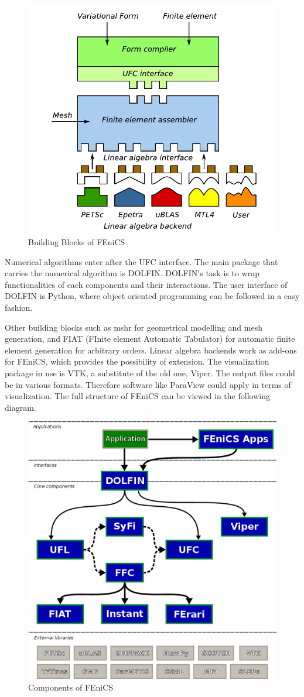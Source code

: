 \documentclass[10pt,a4paper]{scrreprt}
\begin{document}
\begin{figure}[h]
\center
\label{fig: fenics blocks}
\includegraphics[width=0.6\linewidth]{../pics/fenics_building_blocks.png}
\caption{Building Blocks of FEniCS \citep{wells2012automated}}
\end{figure} 

Numerical algorithms enter after the UFC interface. The main package that carries the numerical algorithm is DOLFIN. DOLFIN's task is to wrap functionalities of each components and their interactions. The user interface of DOLFIN is Python, where object oriented programming can be followed in a easy fashion.  

Other building blocks such as mshr for geometrical modelling and mesh generation, and FIAT (FInite element Automatic Tabulator) for automatic finite element generation for arbitrary orders. Linear algebra backends work as add-ons for FEniCS, which provides the possibility of extension. The visualization package in use is VTK, a substitute of the old one, Viper. The output files could be in various formats. Therefore software like ParaView could apply in terms of visualization. The full structure of FEniCS can be viewed in the following diagram.

\begin{figure}[h]
\center
\label{fig: fenics map}
\includegraphics[width=0.5\linewidth]{../pics/fenics_map.png}
\caption{Components of FEniCS \citep{wells2012automated}}
\end{figure} 
\end{document}

